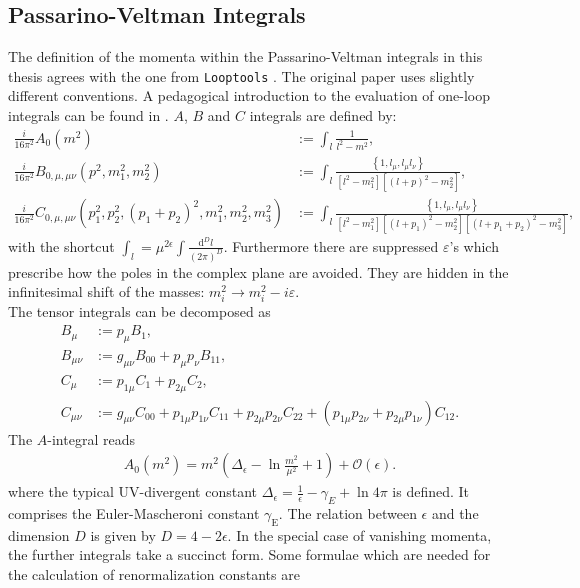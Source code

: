 \subsection{Passarino-Veltman Integrals}\label{sec:Passarino}
The definition of the momenta within the Passarino-Veltman integrals in this thesis agrees with the one from \texttt{Looptools} \cite{Hahn:1998}. The original paper \cite{Passarino:1978jh} uses slightly different conventions. A pedagogical introduction to the evaluation of one-loop integrals can be found in \cite{Ellis:2011cr}.  $A$, $B$ and $C$ integrals are defined by:
\begin{align}
\frac{i}{16\pi^2} A_0(m^2) &:= \int_l \frac{1}{l^2-m^2},\nonumber\\
\frac{i}{16\pi^2} B_{0,\mu,\mu\nu}(p^2,m_1^2,m_2^2) &:= \int_l \frac{\left\{1,l_\mu,l_\mu l_\nu \right\}}{[l^2-m_1^2][(l+p)^2-m_2^2]},\\
\frac{i}{16\pi^2} C_{0,\mu,\mu\nu}(p_1^2,p_2^2,(p_1+p_2)^2,m_1^2,m_2^2,m_3^2) &:= \int_l \frac{\left\{1,l_\mu,l_\mu l_\nu \right\}}{[l^2-m_1^2][(l+p_1)^2-m_2^2][(l+p_1+p_2)^2-m_3^2]},\nonumber\label{eq:LoopInt}
\end{align}
with the shortcut $\int_l = \mu^{2\epsilon}\int\frac{\mathrm{d}^D l}{(2\pi)^D}$. Furthermore there are suppressed $\varepsilon$'s which prescribe how the poles in the complex plane are avoided. They are hidden in the infinitesimal shift of the masses: $m_i^2 \to m_i^2 - i \varepsilon$.\\
The tensor integrals can be decomposed as
\begin{align}
B_\mu &:= p_\mu B_1,\nonumber\\
B_{\mu\nu} &:= g_{\mu\nu}B_{00} + p_\mu p_\nu B_{11},\nonumber\\
C_\mu &:= p_{1\mu}C_1 + p_{2\mu}C_2,\\
C_{\mu\nu} &:= g_{\mu\nu}C_{00} + p_{1\mu}p_{1\nu}C_{11} + p_{2\mu}p_{2\nu}C_{22} + (p_{1\mu}p_{2\nu} + p_{2\mu}p_{1\nu})C_{12}.\nonumber
\end{align}
The $A$-integral reads
\begin{align}
A_0(m^2) = m^2\left( \Delta_\epsilon -\ln \frac{m^2}{\mu^2} + 1 \right) + \mathcal{O}(\epsilon).
\end{align}
where the typical UV-divergent constant $\Delta_\epsilon = \frac{1}{\epsilon} - \gamma_E+\ln 4\pi$ is defined. It comprises the Euler-Mascheroni constant $\gamma_{\mathrm{E}}$. The relation between $\epsilon$ and the dimension $D$ is given by $D = 4-2\epsilon$. In the special case of vanishing momenta, the further integrals take a succinct form. Some formulae which are needed for the calculation of renormalization constants are
